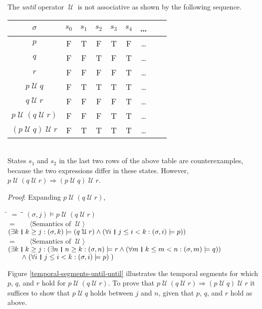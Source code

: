 \documentclass[12pt, fleqn, leqno]{article}
\newcommand{\lgap}{2pt}                             %
\newcommand{\lllgap}{12pt}                          %
\newcommand{\mymathindent}{24pt}                    %
\newcommand{\impl}{\ensuremath{\Rightarrow}}        %
\newcommand{\Until}{\;\mathcal{U}\;}
\newcommand{\myqedtab}{\hspace{384pt}}              %
\newcommand{\thedr}{\rule[-.25ex]{.32mm}{1.75ex}}   %
\newcommand{\dr}{\;\,\thedr\,\;}                    %
\newcommand{\rb}{:}                                 %
\newcommand{\all}{\forall}                          %
\newcommand{\ext}{\exists}                          %
\newcommand{\Gll} {\langle}                         %
\newcommand{\Ggg} {\rangle}                         %
\newcommand{\Hint}[1]     {\ \ \ $\Gll              \mbox{#1} \Ggg$ }   %
\begin{document}
The \textit{until} operator $\Until$ is not associative as shown by the following sequence.\\[\lllgap]
\begin{tabular}{c|cccccccc}
  $\sigma$                  & $s_0$ & $s_1$ & $s_2$ & $s_3$ & $s_4$ & \dots \\
  \hline
  $p$                       & F     & T     & F     & T     & F     &  \dots\\
  $q$                       & F     & F     & T     & F     & T     &  \dots\\
  $r$                       & F     & F     & F     & F     & T     &  \dots\\
  $p\Until q$               & F     & T     & T     & T     & T     &  \dots\\
  $q\Until r$               & F     & F     & F     & F     & T     &  \dots\\
  $p\Until (q\Until r)$     & F     & F     & F     & T     & T     &  \dots\\
  $(p\Until q)\Until r$     & F     & T     & T     & T     & T     &  \dots
\end{tabular}\\[\lllgap]
States $s_1$ and $s_2$ in the last two rows of the above table are counterexamples, because the two expressions differ in these states.
However, $p\Until (q\Until r) \impl (p\Until q)\Until r$.

\emph{Proof}:
Expanding $p\Until (q\Until r)$,
\begin{tabbing}
\hspace{\mymathindent} \= $= \;$ \= \myqedtab \= \kill
	\> \>   $(\sigma,j) \models p\Until (q\Until r)$\\[\lgap]
	\> $=$  \>  \Hint{Semantics of $\Until$}\\[\lgap]
	\> \>   $(\ext k \dr k\ge j \rb (\sigma,k) \models (q \Until r) \land (\all i \dr j\le i < k \rb (\sigma, i) \models p))$\\[\lgap]
	\> $=$  \>  \Hint{Semantics of $\Until$}\\[\lgap]
	\> \>   $(\ext k \dr k\ge j \rb (\ext n \dr n\ge k \rb (\sigma,n)\models r \land (\all m \dr k\le m < n \rb (\sigma,m)\models q))$\\[\lgap]
	\> \>   $\quad \quad \land \; (\all i \dr j\le i < k \rb (\sigma, i) \models p)\;)$
\end{tabbing}

Figure \ref{temporal-segments-until-until} illustrates the temporal segments for which $p$, $q$, and $r$ hold for $p\Until(q\Until r)$.
To prove that $p\Until (q\Until r) \impl (p\Until q)\Until r$ it suffices to show that $p\Until q$ holds between $j$ and $n$, given that $p$, $q$, and $r$ hold as above.
\end{document}
